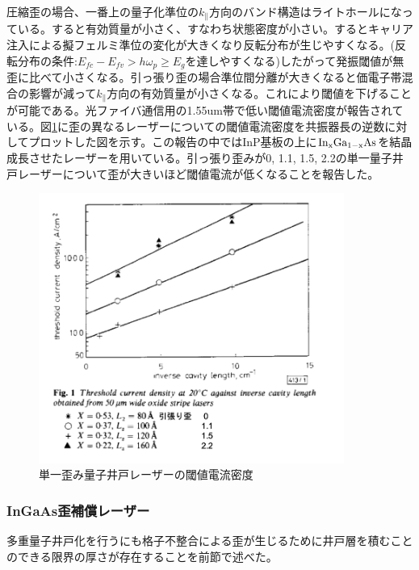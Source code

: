 
圧縮歪の場合、一番上の量子化準位の$k_{\|}$方向のバンド構造はライトホールになっている。すると有効質量が小さく、すなわち状態密度が小さい。するとキャリア注入による擬フェルミ準位の変化が大きくなり反転分布が生じやすくなる。(反転分布の条件:$E_{fc}-E_{fv}>h\omega _{p}\geq E_{g}$を達しやすくなる)したがって発振閾値が無歪に比べて小さくなる。引っ張り歪の場合準位間分離が大きくなると価電子帯混合の影響が減って$k_{\|}$方向の有効質量が小さくなる。これにより閾値を下げることが可能である。光ファイバ通信用の1.55um帯で低い閾値電流密度が報告されている\cite{ref_thijs}。図\ref{fig:fig_lattice_strain_Ith}に歪の異なるレーザーについての閾値電流密度を共振器長の逆数に対してプロットした図を示す。この報告の中ではInP基板の上に$\rm{In_{x}Ga_{1-x}As}$を結晶成長させたレーザーを用いている。引っ張り歪みが0, 1.1, 1.5, 2.2の単一量子井戸レーザーについて歪が大きいほど閾値電流が低くなることを報告した。
\begin{figure}[h]
	\centering
	\includegraphics[width=10cm]{figure/fig_1_1_lattice_strain_Ith.png}
	\caption{単一歪み量子井戸レーザーの閾値電流密度\cite{ref_thijs}}
	\label{fig:fig_lattice_strain_Ith}
\end{figure}

\clearpage
\subsubsection{InGaAs歪補償レーザー}
多重量子井戸化を行うにも格子不整合による歪が生じるために井戸層を積むことのできる限界の厚さが存在することを前節で述べた。


